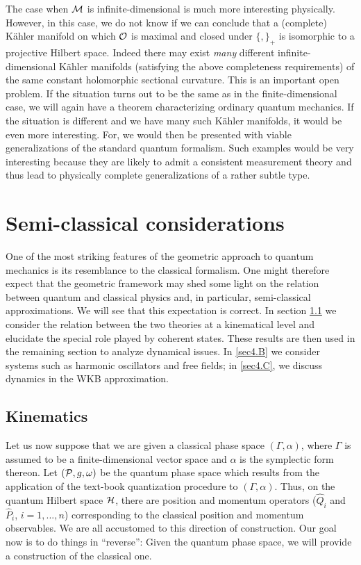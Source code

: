 \documentclass[12pt,aps,eqsecnum,tighten,nofootinbib]{revtex4-2}
\def\a{\alpha}
\def\H{{\cal H}}
\def\P{{\cal P}}
\def\M{{\cal M}}
\def\w{\omega}
\begin{document}
The case when $\M$ is infinite-dimensional is much more interesting
physically. However, in this case, we do not know if we can conclude
that a (complete) K\"ahler manifold on which ${\cal O}$ is maximal and
closed under $\{ , \}_+$ is isomorphic to a projective Hilbert space.
Indeed there may exist {\em many} different infinite-dimensional
K\"ahler manifolds (satisfying the above completeness requirements) of
the same constant holomorphic sectional curvature. This is an
important open problem. If the situation turns out to be the same as
in the finite-dimensional case, we will again have a theorem
characterizing ordinary quantum mechanics. If the situation is
different and we have many such K\"ahler manifolds, it would be even
more interesting. For, we would then be presented with viable
generalizations of the standard quantum formalism. Such examples would
be very interesting because they are likely to admit a consistent
measurement theory and thus lead to physically complete
generalizations of a rather subtle type.


\section{Semi-classical considerations} \label{sec4}

One of the most striking features of the geometric approach to quantum
mechanics is its resemblance to the classical formalism. One might
therefore expect that the geometric framework may shed some light on
the relation between quantum and classical physics and, in particular,
semi-classical approximations. We will see that this expectation is
correct. In section \ref{sec4.A} we consider the relation between the
two theories at a kinematical level and elucidate the special role
played by coherent states. These results are then used in the
remaining section to analyze dynamical issues. In \ref{sec4.B} we
consider systems such as harmonic oscillators and free fields; in
\ref{sec4.C}, we discuss dynamics in the WKB approximation.

 
\subsection{Kinematics} \label{sec4.A}

Let us now suppose that we are given a classical phase space $(\Gamma,
\a)$, where $\Gamma$ is assumed to be a finite-dimensional vector
space and $\a$ is the symplectic form thereon. Let $(\P, g, \w)$ be
the quantum phase space which results from the application of the
text-book quantization procedure to $(\Gamma, \a)$. Thus, on the
quantum Hilbert space $\H$, there are position and momentum operators
($\hat{Q}_i$ and $\hat{P}_i$, $i=1, ..., n$) corresponding to the
classical position and momentum observables.  We are all accustomed to
this direction of construction. Our goal now is to do things in
``reverse'': Given the quantum phase space, we will provide a
construction of the classical one.
\end{document}

